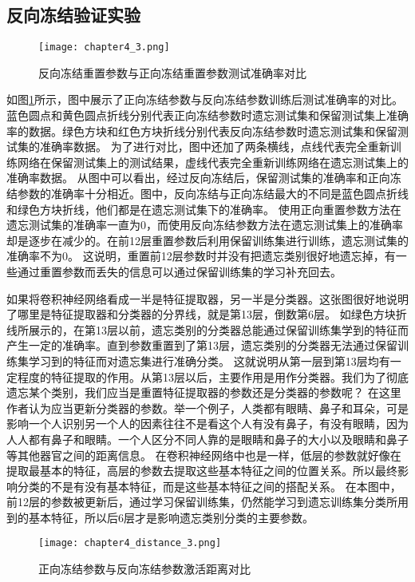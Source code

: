 \subsection{反向冻结验证实验}
\begin{figure}
    \centering
    \texttt{[image: chapter4\_3.png]}
    \caption{反向冻结重置参数与正向冻结重置参数测试准确率对比}
    \label{fig:chapter4_3}
\end{figure}

如图\ref{fig:chapter4_3}所示，图中展示了正向冻结参数与反向冻结参数训练后测试准确率的对比。
蓝色圆点和黄色圆点折线分别代表正向冻结参数时遗忘测试集和保留测试集上准确率的数据。绿色方块和红色方块折线分别代表反向冻结参数时遗忘测试集和保留测试集的准确率数据。
为了进行对比，图中还加了两条横线，点线代表完全重新训练网络在保留测试集上的测试结果，虚线代表完全重新训练网络在遗忘测试集上的准确率数据。
从图中可以看出，经过反向冻结后，保留测试集的准确率和正向冻结参数的准确率十分相近。图中，反向冻结与正向冻结最大的不同是蓝色圆点折线和绿色方块折线，他们都是在遗忘测试集下的准确率。
使用正向重置参数方法在遗忘测试集的准确率一直为0，而使用反向冻结参数方法在遗忘测试集上的准确率却是逐步在减少的。在前12层重置参数后利用保留训练集进行训练，遗忘测试集的准确率不为0。
这说明，重置前12层参数时并没有把遗忘类别很好地遗忘掉，有一些通过重置参数而丢失的信息可以通过保留训练集的学习补充回去。

如果将卷积神经网络看成一半是特征提取器，另一半是分类器。这张图很好地说明了哪里是特征提取器和分类器的分界线，就是第13层，倒数第6层。
如绿色方块折线所展示的，在第13层以前，遗忘类别的分类器总能通过保留训练集学到的特征而产生一定的准确率。直到参数重置到了第13层，遗忘类别的分类器无法通过保留训练集学习到的特征而对遗忘集进行准确分类。
这就说明从第一层到第13层均有一定程度的特征提取的作用。从第13层以后，主要作用是用作分类器。我们为了彻底遗忘某个类别，我们应当是重置特征提取器的参数还是分类器的参数呢？
在这里作者认为应当更新分类器的参数。举一个例子，人类都有眼睛、鼻子和耳朵，可是影响一个人识别另一个人的因素往往不是看这个人有没有鼻子，有没有眼睛，因为人人都有鼻子和眼睛。一个人区分不同人靠的是眼睛和鼻子的大小以及眼睛和鼻子等其他器官之间的距离信息。
在卷积神经网络中也是一样，低层的参数就好像在提取最基本的特征，高层的参数去提取这些基本特征之间的位置关系。所以最终影响分类的不是有没有基本特征，而是这些基本特征之间的搭配关系。
在本图中，前12层的参数被更新后，通过学习保留训练集，仍然能学习到遗忘训练集分类所用到的基本特征，所以后6层才是影响遗忘类别分类的主要参数。
\begin{figure}
    \centering
    \texttt{[image: chapter4\_distance\_3.png]}
    \caption{正向冻结参数与反向冻结参数激活距离对比}
    \label{fig:chapter4_distance_3}
\end{figure}

